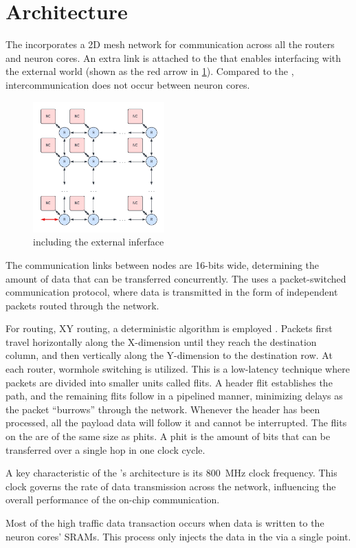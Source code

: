 \section{Architecture}
The \confignoc{} incorporates a 2D mesh network for communication across all the routers and neuron cores.
An extra link is attached to the \confignoc{} that enables interfacing with the external world (shown as the red arrow in \cref{fig:config_noc_ext}).
Compared to the \eventnoc{}, intercommunication does not occur between neuron cores.

\begin{figure}[hbtp]
\centering    
\includegraphics[width=0.45\textwidth]{assets/config_noc_inj.pdf}
\caption{\confignoc{} including the external inferface}
\label{fig:config_noc_ext}
\end{figure}

The communication links between nodes are 16-bits wide, determining the amount of data that can be transferred concurrently.
The \confignoc{} uses a packet-switched communication protocol, where data is transmitted in the form of independent packets routed through the network.

For routing, XY routing, a deterministic algorithm is employed \autocite{glassTurnModelAdaptive1992}.
Packets first travel horizontally along the X-dimension until they reach the destination column, and then vertically along the Y-dimension to the destination row.
At each router, wormhole switching is utilized.
This is a low-latency technique where packets are divided into smaller units called flits.
A header flit establishes the path, and the remaining flits follow in a pipelined manner, minimizing delays as the packet ``burrows'' through the network.
Whenever the header has been processed, all the payload data will follow it and cannot be interrupted.
The flits on the \confignoc{} are of the same size as phits.
A phit is the amount of bits that can be transferred over a single hop in one clock cycle.

A key characteristic of the \confignoc{}'s architecture is its \SI{800}{MHz} clock frequency.
This clock governs the rate of data transmission across the network, influencing the overall performance of the on-chip communication.

Most of the high traffic data transaction occurs when data is written to the neuron cores' SRAMs.
This process only injects the data in the \confignoc{} via a single point.
